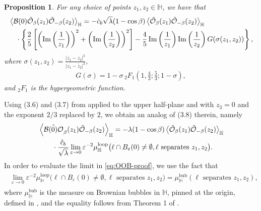 \documentclass[a4paper,11pt]{article}
\newtheorem{proposition}{Proposition}[section]
\renewcommand{\Im}{\operatorname{Im}}
\begin{document}
\begin{proposition} \label{prop:OOB}
For any choice of points $z_1,z_2 \in \mathbb{H}$, we have that
\begin{align}
\begin{split} \label{eq:OOB}
    & \Braket{\mathcal{B}(0) \tilde{\mathcal{O}}_{\beta}(z_1) \tilde{\mathcal{O}}_{-\beta}(z_2) }_{\mathbb{H}} = -\hat{c}_b \sqrt{\lambda} (1-\cos\beta) \Braket{\tilde{\mathcal{O}}_{\beta}(z_1) \tilde{\mathcal{O}}_{-\beta}(z_2)}_{\mathbb{H}} \\
    & \quad \cdot \left\{ \frac{2}{5} \left[ \left(\Im\left(\frac{1}{z_1}\right)\right)^2 + \left(\Im\left(\frac{1}{z_2}\right)\right)^2 \right] - \frac{4}{5} \Im\left(\frac{1}{z_1}\right) \Im\left(\frac{1}{z_2}\right) G(\sigma(z_1,z_2)) \right\}, 
\end{split}
\end{align}
where $\sigma(z_1,z_2) = \frac{|z_1-z_2|^2}{|z_1-\bar{z}_2|^2}$,
\begin{align}
    G(\sigma) = 1 - \sigma \, {}_2 F_1\left(1,\frac{4}{3};\frac{5}{3};1-\sigma \right),
\end{align}
and ${}_2 F_1$ is the hypergeometric function.
\end{proposition}
Using (3.6) and (3.7) from \cite{camia2021scalar} applied to the upper half-plane and with $z_3=0$ and the exponent $2/3$ replaced by $2$, we obtain an analog of (3.8) therein, namely
\begin{align}
\begin{split} \label{eq:OOB-proof}
    & \Braket{\tilde{ \mathcal{B}(0) \mathcal{O}}_{\beta}(z_1) \tilde{\mathcal{O}}_{-\beta}(z_2) }_{\mathbb{H}} = - \lambda (1-\cos\beta) \Braket{\tilde{\mathcal{O}}_{\beta}(z_1) \tilde{\mathcal{O}}_{-\beta}(z_2)}_{\mathbb{H}} \\
    &\qquad \cdot \frac{\hat{c}_b}{\sqrt{\lambda}} \lim_{\varepsilon \to 0} \varepsilon^{-2} \mu^{\text{loop}}_{\mathbb{H}}\big( \ell \cap B_{\varepsilon}(0) \neq \emptyset, \ell \text{ separates } z_1,z_2 \big).
\end{split}
\end{align}
In order to evaluate the limit in \eqref{eq:OOB-proof}, we use the fact that
\begin{align}
\begin{split} \label{eq:measures}
    \lim_{\varepsilon \to 0} \varepsilon^{-2} \mu^{\text{loop}}_{\mathbb{H}}\big( \ell \cap B_{\varepsilon}(0) \neq \emptyset, \ell \text{ separates } z_1,z_2 \big) = \mu^{\text{bub}}_{\mathbb{H}}(\ell \text{ separates } z_1,z_2),
\end{split}
\end{align}
where $\mu^{\text{bub}}_{\mathbb{H}}$ is the measure on Brownian bubbles in $\mathbb{H}$, pinned at the origin, defined in \cite{lawler2004brownian}, and the equality follows from Theorem 1 of \cite{lawler2004brownian}.
\end{document}
